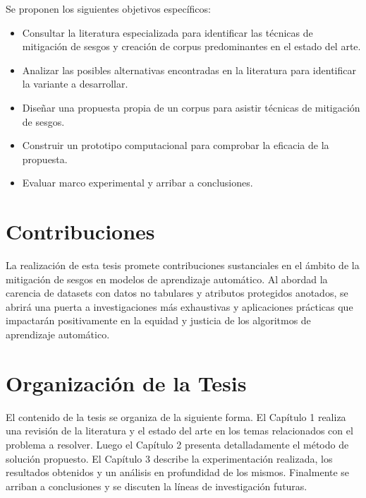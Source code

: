 Se proponen los siguientes objetivos espec\'ificos:
\begin{itemize}
    \item Consultar la literatura especializada para identificar las t\'ecnicas de mitigaci\'on de sesgos y creaci\'on
    de corpus predominantes en el estado del arte.
    \item Analizar las posibles alternativas encontradas en la literatura para identificar la variante a desarrollar.
    \item Dise\~nar una propuesta propia de un corpus para asistir t\'ecnicas de mitigaci\'on de sesgos. 
    \item Construir un prototipo computacional para comprobar la eficacia de la propuesta.
    \item Evaluar marco experimental y arribar a conclusiones.
\end{itemize}

\section*{Contribuciones}
La realizaci\'on de esta tesis promete contribuciones sustanciales en el \'ambito de la mitigaci\'on de sesgos en modelos de aprendizaje 
autom\'atico. Al abordad la carencia de datasets con datos no tabulares y atributos protegidos anotados, se abrir\'a una puerta a 
investigaciones m\'as exhaustivas y aplicaciones pr\'acticas que impactar\'an positivamente en la equidad y justicia de los algoritmos 
de aprendizaje autom\'atico.

\section*{Organizaci\'on de la Tesis}
El contenido de la tesis se organiza de la siguiente forma. El Cap\'itulo 1 realiza una revisi\'on de la literatura y el estado del arte 
en los temas relacionados con el problema a resolver. Luego el Cap\'itulo 2 presenta detalladamente el m\'etodo de soluci\'on propuesto. 
El Cap\'itulo 3 describe la experimentaci\'on realizada, los resultados obtenidos y un an\'alisis en profundidad de los mismos. 
Finalmente se arriban a conclusiones y se discuten la l\'ineas de investigaci\'on futuras.  
